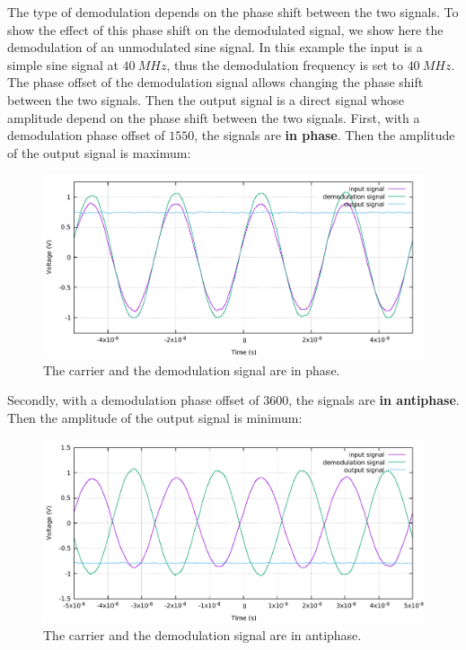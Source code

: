 \documentclass[12pt,oneside]{article}
\begin{document}
The type of demodulation depends on the phase shift between the two signals. To show the effect of this phase shift on the demodulated signal, we show here the demodulation of an unmodulated sine signal. In this example the input is a simple sine signal at $40~MHz$, thus the demodulation frequency is set to $40~MHz$. The phase offset of the demodulation signal allows changing the phase shift between the two signals. Then the output signal is a direct signal whose amplitude depend on the phase shift between the two signals.
\newline\newline
First, with a demodulation phase offset of $1550$, the signals are \textbf{in phase}. Then the amplitude of the output signal is maximum:

\begin{figure}[!h!tb]
	\begin{center}
		\includegraphics[width=13cm,trim={0cm 0cm 0cm 0cm}, clip]{scope/demods1.pdf}
		\caption{The carrier and the demodulation signal are in phase.}
		\label{curv:demodsine1}
	\end{center}
\end{figure}

Secondly, with a demodulation phase offset of $3600$, the signals are \textbf{in antiphase}. Then the amplitude of the output signal is minimum:
\newline

\begin{figure}[!h!tb]
	\begin{center}
		\includegraphics[width=13cm,trim={0cm 0cm 0cm 0cm}, clip]{scope/demods2.pdf}
		\caption{The carrier and the demodulation signal are in antiphase.}
		\label{curv:demodsine2}
	\end{center}
\end{figure}
\end{document}
